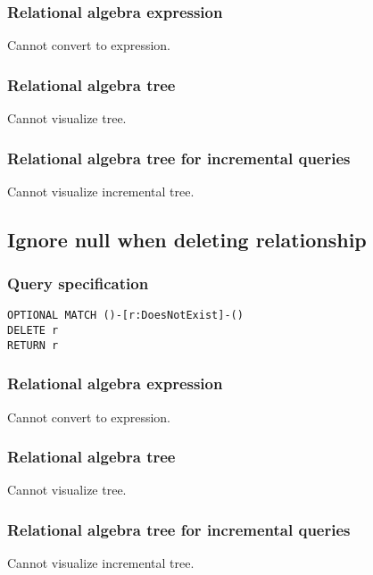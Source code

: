 \subsubsection*{Relational algebra expression}

Cannot convert to expression.

\subsubsection*{Relational algebra tree}

Cannot visualize tree.

\subsubsection*{Relational algebra tree for incremental queries}

Cannot visualize incremental tree.

\subsection{Ignore null when deleting relationship}

\subsubsection*{Query specification}

\begin{lstlisting}
OPTIONAL MATCH ()-[r:DoesNotExist]-()
DELETE r
RETURN r
\end{lstlisting}

\subsubsection*{Relational algebra expression}

Cannot convert to expression.

\subsubsection*{Relational algebra tree}

Cannot visualize tree.

\subsubsection*{Relational algebra tree for incremental queries}

Cannot visualize incremental tree.

